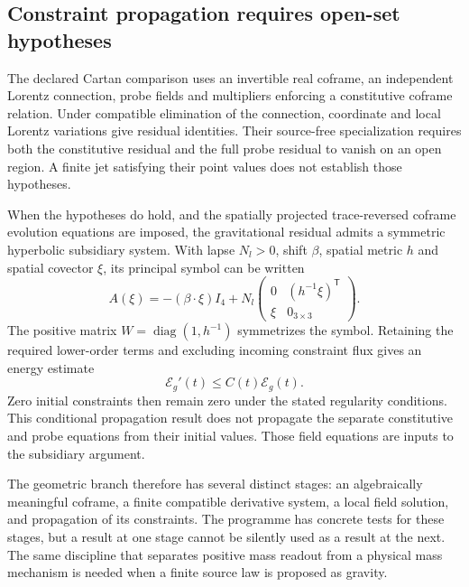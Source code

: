 \subsection{Constraint propagation requires open-set hypotheses}
The declared Cartan comparison uses an invertible real coframe, an
independent Lorentz connection, probe fields and multipliers enforcing
a constitutive coframe relation. Under compatible elimination of the
connection, coordinate and local Lorentz variations give residual
identities. Their source-free specialization requires both the
constitutive residual and the full probe residual to vanish on an
open region. A finite jet satisfying their point values does not
establish those hypotheses.

When the hypotheses do hold, and the spatially projected
trace-reversed coframe evolution equations are imposed, the
gravitational residual admits a symmetric hyperbolic subsidiary
system. With lapse $N_l>0$, shift $\beta$, spatial metric $h$ and
spatial covector $\xi$, its principal symbol can be written
\begin{equation}
 A(\xi)=-(\beta\cdot\xi)I_4+
 N_l\begin{pmatrix}0&(h^{-1}\xi)^{\mathsf T}\\
                         \xi&0_{3\times3}\end{pmatrix}.
\end{equation}
The positive matrix $W=\operatorname{diag}(1,h^{-1})$ symmetrizes
the symbol. Retaining the required lower-order terms and excluding
incoming constraint flux gives an energy estimate
\begin{equation}
 \mathcal E_g'(t)\leq C(t)\mathcal E_g(t).
\end{equation}
Zero initial constraints then remain zero under the stated regularity
conditions. This conditional propagation result does not propagate
the separate constitutive and probe equations from their initial
values. Those field equations are inputs to the subsidiary argument.

The geometric branch therefore has several distinct stages: an
algebraically meaningful coframe, a finite compatible derivative
system, a local field solution, and propagation of its constraints.
The programme has concrete tests for these stages, but a result at
one stage cannot be silently used as a result at the next. The same
discipline that separates positive mass readout from a physical mass
mechanism is needed when a finite source law is proposed as gravity.
